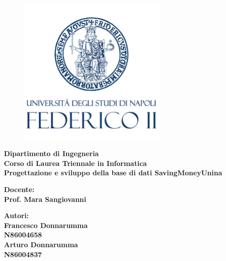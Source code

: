 \begin{titlepage} %
    \begin{figure}[t] %
        \centering\includegraphics[width=0.65\textwidth]{images/FII_logo.png}
    \end{figure}
    \vspace{20mm}
    
    \begin{Large}
     \begin{center}
        \textbf{Dipartimento di Ingegneria\\ Corso di Laurea Triennale in Informatica\\}
        \vspace{20mm}
        {\huge{\bf Progettazione e sviluppo della base di dati SavingMoneyUnina}}\\
    \end{center}
    \end{Large}
    
    
    \vspace{36mm}
    \begin{minipage}[t]{0.47\textwidth}
        {\large{\bf Docente:\\ Prof. Mara Sangiovanni}}
    \end{minipage}
    \hfill
    \begin{minipage}[t]{0.47\textwidth}\raggedleft
        {\large{\bf Autori: \\ Francesco Donnarumma\\ N86004658\\ Arturo Donnarumma\\ N86004837\\}}
    \end{minipage}
    
    \vspace{25mm}
    
    \hrulefill
    
    \vspace{5mm}
    
    
    \end{titlepage}